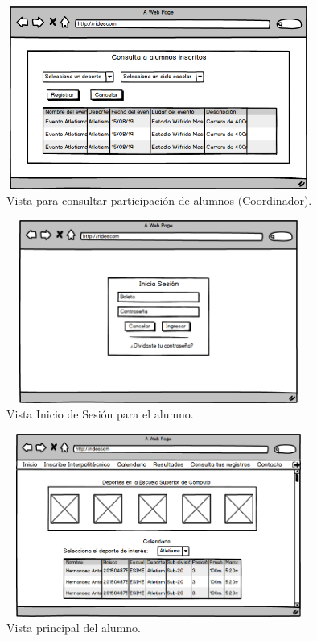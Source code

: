 		\begin{figure} [hbt!]
			\centering
			\includegraphics[width=10cm, height=6cm]{Imagenes/Nuevos/P16_Consulta_para_expedir_constancias}
			\caption{Vista para consultar participación de alumnos (Coordinador).}
			\label{consultaparaexpedirconstancias}
		\end{figure}
		
		\begin{figure} [hbt!]
			\centering
			\includegraphics[width=10cm, height=6cm]{Imagenes/Nuevos/P17_Login_alumno}
			\caption{Vista Inicio de Sesión para el alumno.}
			\label{loginalumno}
		\end{figure}
		
	\pagebreak
		\begin{figure} [hbt!]
			\centering
			\includegraphics[width=10cm, height=6cm]{Imagenes/Nuevos/P18_Inicio_paticipante}
			\caption{Vista principal del alumno.}
			\label{principalalum}
		\end{figure}
		
